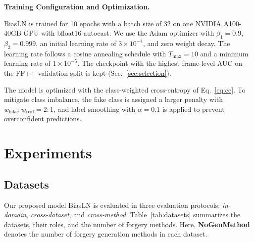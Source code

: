 \documentclass[fonts]{icst}
\newif\ifrevmark\revmarktrue
\newcommand{\rev}[1]{\ifrevmark{\color{revblue}#1}\else#1\fi}
\begin{document}
\noindent\textbf{Training Configuration and Optimization.}\par
BiasLN is trained for 10 epochs with a batch size of 32 on \rev{one NVIDIA A100-40GB GPU with bfloat16 autocast}.
We use the Adam optimizer with $\beta_1 = 0.9$, $\beta_2 = 0.999$, an initial learning rate of $3 \times 10^{-4}$, and zero weight decay.
The learning rate follows a cosine annealing schedule with $T_{\max}=10$ and a minimum learning rate of $1 \times 10^{-5}$.
\rev{The checkpoint with the highest frame-level AUC on the FF++ validation split is kept (Sec.~\ref{sec:selection}).}

The model is optimized with \rev{the} class-weighted cross-entropy \rev{of Eq.~\eqref{eq:ce}}. To mitigate class imbalance, the fake class is assigned a larger penalty with $w_{\mathrm{fake}}:w_{\mathrm{real}} = 2:1$, and label smoothing with $\alpha = 0.1$ is applied to prevent overconfident predictions.

\section{Experiments}
\subsection{Datasets}
\label{sec:datasets}
\label{sec:protocol}

Our proposed model BiasLN \rev{is} evaluated in three evaluation protocols: \textit{in-domain}, \textit{cross-dataset}, and \textit{cross-method}.
Table~\ref{tab:datasets} summarizes the datasets, their roles, and the number of forgery methods.
Here, \textbf{NoGenMethod} denotes the number of forgery generation methods in each dataset.
\end{document}
